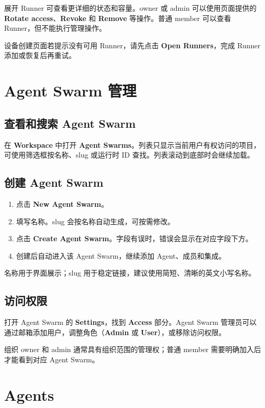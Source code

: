 \documentclass[UTF8,a4paper,11pt]{ctexart}
\begin{document}
展开 Runner 可查看更详细的状态和容量。owner 或 admin 可以使用页面提供的 \textbf{Rotate access}、\textbf{Revoke} 和 \textbf{Remove} 等操作。普通 member 可以查看 Runner，但不能执行管理操作。

设备创建页面若提示没有可用 Runner，请先点击 \textbf{Open Runners}，完成 Runner 添加或恢复后再重试。

\section{Agent Swarm 管理}

\subsection{查看和搜索 Agent Swarm}

在 \textbf{Workspace} 中打开 \textbf{Agent Swarms}。列表只显示当前用户有权访问的项目，可使用筛选框按名称、slug 或运行时 ID 查找。列表滚动到底部时会继续加载。

\subsection{创建 Agent Swarm}

\begin{enumerate}
  \item 点击 \textbf{New Agent Swarm}。
  \item 填写名称。slug 会按名称自动生成，可按需修改。
  \item 点击 \textbf{Create Agent Swarm}。字段有误时，错误会显示在对应字段下方。
  \item 创建后自动进入该 Agent Swarm，继续添加 Agent、成员和集成。
\end{enumerate}

名称用于界面展示；slug 用于稳定链接，建议使用简短、清晰的英文小写名称。

\subsection{访问权限}

打开 Agent Swarm 的 \textbf{Settings}，找到 \textbf{Access} 部分。Agent Swarm 管理员可以通过邮箱添加用户，调整角色（\textbf{Admin} 或 \textbf{User}），或移除访问权限。

组织 owner 和 admin 通常具有组织范围的管理权；普通 member 需要明确加入后才能看到对应 Agent Swarm。

\section{Agents}
\end{document}
